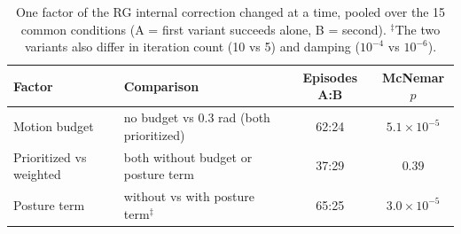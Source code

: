\begin{table}[t]
\centering
\caption{One factor of the RG internal correction changed at a time, pooled over the 15 common conditions (A = first variant succeeds alone, B = second). $^\ddagger$The two variants also differ in iteration count (10 vs 5) and damping ($10^{-4}$ vs $10^{-6}$).}
\label{tab:rg_factors}
\setlength{\tabcolsep}{3pt}
\begin{tabular}{llcc}
\toprule
Factor & Comparison & Episodes A:B & McNemar $p$ \\
\midrule
Motion budget & no budget vs 0.3 rad (both prioritized) & 62:24 & $5.1\times10^{-5}$ \\
Prioritized vs weighted & both without budget or posture term & 37:29 & 0.39 \\
Posture term & without vs with posture term$^\ddagger$ & 65:25 & $3.0\times10^{-5}$ \\
\bottomrule
\end{tabular}
\end{table}
